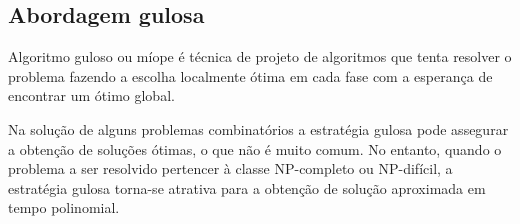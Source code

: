 \subsection{Abordagem gulosa}

    Algoritmo guloso ou míope é técnica de projeto de algoritmos que tenta resolver
    o problema fazendo a escolha localmente ótima em cada fase com a esperança de
    encontrar um ótimo global.

    Na solução de alguns problemas combinatórios a estratégia gulosa pode
    assegurar a obtenção de soluções ótimas, o que não é muito comum. No
    entanto, quando o problema a ser resolvido pertencer à classe NP-completo
    ou NP-difícil, a estratégia gulosa torna-se atrativa para a obtenção de
    solução aproximada em tempo polinomial.
